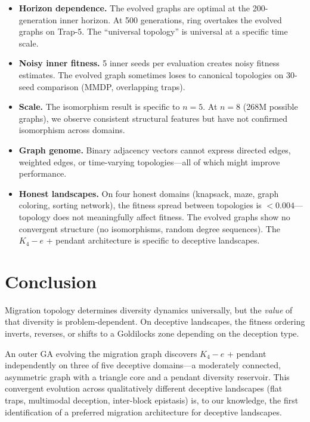 \documentclass[sigconf,nonacm]{acmart}
\begin{document}
\begin{itemize}
\item \textbf{Horizon dependence.} The evolved graphs are optimal at
  the 200-generation inner horizon. At 500 generations, ring
  overtakes the evolved graphs on Trap-5. The ``universal topology''
  is universal at a specific time scale.
\item \textbf{Noisy inner fitness.} 5 inner seeds per evaluation
  creates noisy fitness estimates. The evolved graph sometimes loses
  to canonical topologies on 30-seed comparison (MMDP, overlapping
  traps).
\item \textbf{Scale.} The isomorphism result is specific to $n = 5$.
  At $n = 8$ (268M possible graphs), we observe consistent structural
  features but have not confirmed isomorphism across domains.
\item \textbf{Graph genome.} Binary adjacency vectors cannot express
  directed edges, weighted edges, or time-varying topologies---all of
  which might improve performance.
\item \textbf{Honest landscapes.} On four honest domains (knapsack,
  maze, graph coloring, sorting network), the fitness spread between
  topologies is $< 0.004$---topology does not meaningfully affect
  fitness. The evolved graphs show no convergent structure (no
  isomorphisms, random degree sequences). The $K_4 - e$ + pendant
  architecture is specific to deceptive landscapes.
\end{itemize}


\section{Conclusion}

Migration topology determines diversity dynamics universally, but the
\emph{value} of that diversity is problem-dependent. On deceptive
landscapes, the fitness ordering inverts, reverses, or shifts to a
Goldilocks zone depending on the deception type.

An outer GA evolving the migration graph discovers $K_4 - e$ + pendant
independently on three of five deceptive domains---a moderately
connected, asymmetric graph with a triangle core and a pendant
diversity reservoir. This convergent evolution across qualitatively
different deceptive landscapes (flat traps, multimodal deception,
inter-block epistasis) is, to our knowledge, the first identification
of a preferred migration architecture for deceptive landscapes.
\end{document}
